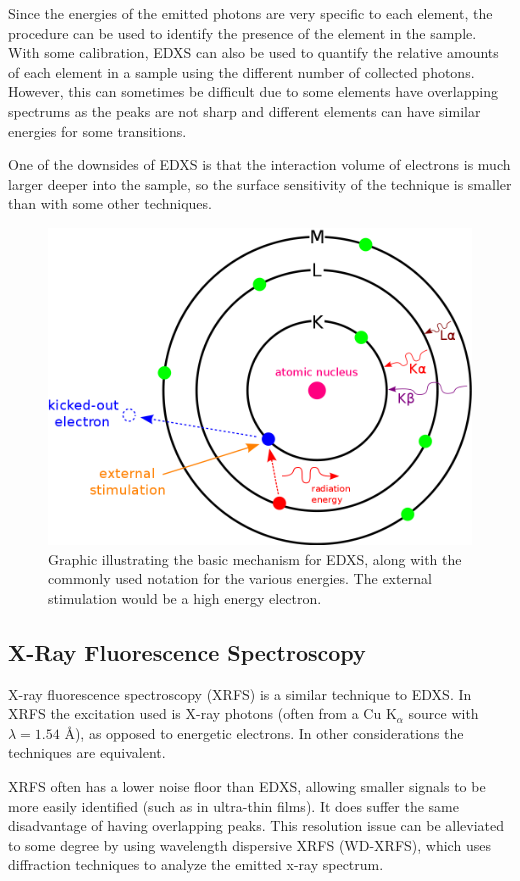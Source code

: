 Since the energies of the emitted photons are very specific to each element, the procedure can be used to identify the presence of the element in the sample. With some calibration, EDXS can also be used to quantify the relative amounts of each element in a sample using the different number of collected photons. However, this can sometimes be difficult due to some elements have overlapping spectrums as the peaks are not sharp and different elements can have similar energies for some transitions. 

One of the downsides of EDXS is that the interaction volume of electrons is much larger deeper into the sample, so the surface sensitivity of the technique is smaller than with some other techniques. 

\begin{figure}[tb]
   \centering
   \includegraphics[width=0.66\linewidth]{./figures/characterization/EDXS-scheme} 
   \caption[Illustration of EDXS principle]%
   		{Graphic illustrating the basic mechanism for EDXS, along with the commonly used %
		notation for the various energies. The external stimulation would be a high energy %
		electron.}
   \label{fig:EDXS-image}
\end{figure}




\subsection{X-Ray Fluorescence Spectroscopy}

X-ray fluorescence spectroscopy (XRFS) is a similar technique to EDXS. In XRFS the excitation used is X-ray photons (often from a Cu K$_{\alpha}$ source with $\lambda = 1.54$ \AA), as opposed to energetic electrons. In other considerations the techniques are equivalent. 

XRFS often has a lower noise floor than EDXS, allowing smaller signals to be more easily identified (such as in ultra-thin films). It does suffer the same disadvantage of having overlapping peaks. This resolution issue can be alleviated to some degree by using wavelength dispersive XRFS (WD-XRFS), which uses diffraction techniques to analyze the emitted x-ray spectrum. 

